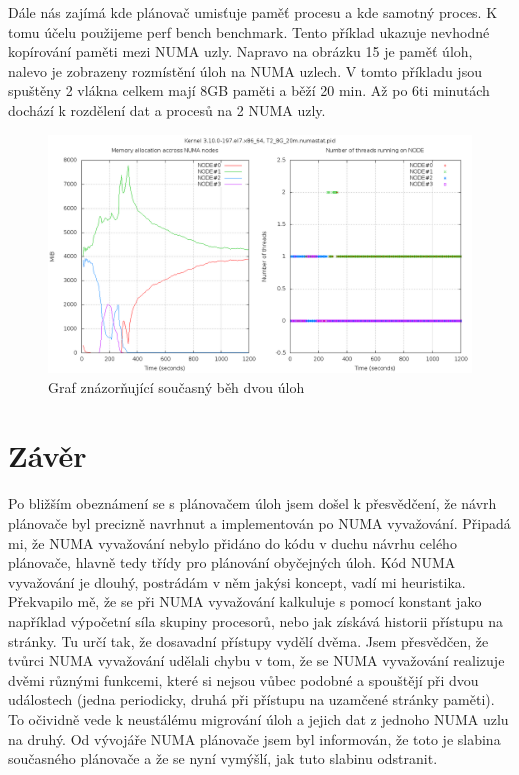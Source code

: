 \documentclass[
  master=true,
  font=sans,
  printversion=false,
  joinlists=true,
  figures=true,
  tables=true,
  sourcecodes=false,
  theorems=false,
  bibencoding=utf8,
  language=czech,
  encoding=utf8,
  field=ainfk,
  biblatex,
  glossaries,
  index
]{kidiplom}
\begin{document}
Dále nás zajímá kde plánovač umisťuje paměť procesu a kde samotný proces. K tomu účelu použijeme perf bench benchmark. Tento příklad ukazuje nevhodné kopírování paměti mezi NUMA uzly. Napravo na obrázku 15 je paměť úloh, nalevo je zobrazeny rozmístění úloh na NUMA uzlech. V tomto příkladu jsou spuštěny 2 vlákna celkem mají 8GB paměti a běží 20 min. Až po 6ti minutách dochází k rozdělení dat a procesů na 2 NUMA uzly. 

\begin{figure}[ht]
\includegraphics[scale=0.30]{obrazky/PerfBenchResult.png}
\caption{Graf znázorňující současný běh dvou úloh}
\label{PerfBenchResult}
\end{figure}

\section{Závěr}
Po bližším obeznámení se s plánovačem úloh jsem došel k přesvědčení, že návrh plánovače byl precizně navrhnut a implementován po NUMA vyvažování. Připadá mi, že NUMA vyvažování nebylo přidáno do kódu v duchu návrhu celého plánovače, hlavně tedy třídy pro plánování obyčejných úloh. Kód NUMA vyvažování je dlouhý, postrádám v něm jakýsi koncept, vadí mi heuristika. Překvapilo mě, že se při NUMA vyvažování kalkuluje s pomocí konstant jako například výpočetní síla skupiny procesorů, nebo jak získává historii přístupu na stránky. Tu určí tak, že dosavadní přístupy vydělí dvěma. Jsem přesvědčen, že tvůrci NUMA vyvažování udělali chybu v tom, že se NUMA vyvažování realizuje dvěmi různými funkcemi, které si nejsou vůbec podobné a spouštějí při dvou událostech (jedna periodicky, druhá při přístupu na uzamčené stránky paměti). To očividně vede k neustálému migrování úloh a jejich dat z jednoho NUMA uzlu na druhý. Od vývojáře NUMA plánovače jsem byl informován, že toto je slabina současného plánovače a že se nyní vymýšlí, jak tuto slabinu odstranit. 
\end{document}
